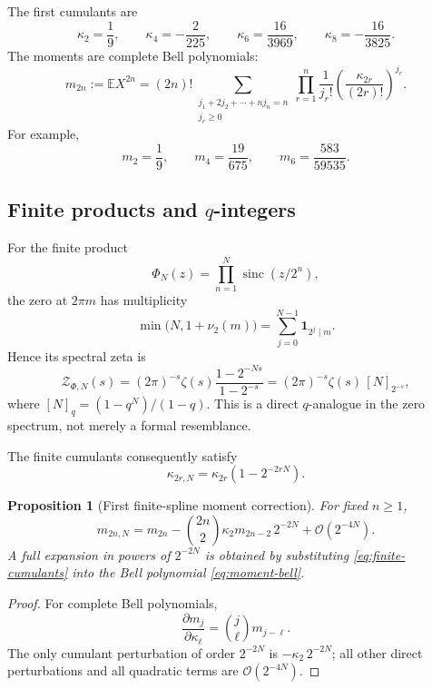 \documentclass[11pt,oneside]{article}
\newtheorem{proposition}[theorem]{Proposition}
\theoremstyle{definition}
\theoremstyle{remark}
\newcommand{\sinc}{\operatorname{sinc}}
\newcommand{\E}{\mathbb E}
\newcommand{\bigO}{\mathcal O}
\begin{document}
The first cumulants are
\[
 \kappa_2=\frac19,\qquad
 \kappa_4=-\frac2{225},\qquad
 \kappa_6=\frac{16}{3969},\qquad
 \kappa_8=-\frac{16}{3825}.
\]
The moments are complete Bell polynomials:
\begin{equation}
 m_{2n}:=\E X^{2n}
 =(2n)!\!
 \sum_{\substack{j_1+2j_2+\cdots+nj_n=n\\j_r\geq0}}
 \prod_{r=1}^{n}
 \frac1{j_r!}
 \left(\frac{\kappa_{2r}}{(2r)!}\right)^{j_r}.
 \label{eq:moment-bell}
\end{equation}
For example,
\[
 m_2=\frac19,\qquad
 m_4=\frac{19}{675},\qquad
 m_6=\frac{583}{59535}.
\]

\subsection{Finite products and \(q\)-integers}

For the finite product
\[
 \Phi_N(z)=\prod_{n=1}^{N}\sinc(z/2^n),
\]
the zero at \(2\pi m\) has multiplicity
\[
 \min\!\bigl(N,1+\nu_2(m)\bigr)
 =\sum_{j=0}^{N-1}\mathbf1_{2^j\mid m}.
\]
Hence its spectral zeta is
\begin{equation}
 \mathcal Z_{\Phi,N}(s)
 =(2\pi)^{-s}\zeta(s)
   \frac{1-2^{-Ns}}{1-2^{-s}}
 =(2\pi)^{-s}\zeta(s)\,[N]_{2^{-s}},
 \label{eq:finite-qinteger}
\end{equation}
where \([N]_q=(1-q^N)/(1-q)\).  This is a direct \(q\)-analogue in the
zero spectrum, not merely a formal resemblance.

The finite cumulants consequently satisfy
\begin{equation}
 \kappa_{2r,N}=\kappa_{2r}(1-2^{-2rN}).
 \label{eq:finite-cumulants}
\end{equation}

\begin{proposition}[First finite-spline moment correction]
\label{prop:moment-convergence}
For fixed \(n\geq1\),
\begin{equation}
 m_{2n,N}
 =m_{2n}
 -\binom{2n}{2}\kappa_2m_{2n-2}\,2^{-2N}
 +\bigO(2^{-4N}).
 \label{eq:moment-convergence}
\end{equation}
A full expansion in powers of \(2^{-2N}\) is obtained by substituting
\eqref{eq:finite-cumulants} into the Bell polynomial
\eqref{eq:moment-bell}.
\end{proposition}

\begin{proof}
For complete Bell polynomials,
\[
 \frac{\partial m_j}{\partial\kappa_\ell}
 =\binom j\ell m_{j-\ell}.
\]
The only cumulant perturbation of order \(2^{-2N}\) is
\(-\kappa_2\,2^{-2N}\); all other direct perturbations and all quadratic
terms are \(\bigO(2^{-4N})\).
\end{proof}
\end{document}
